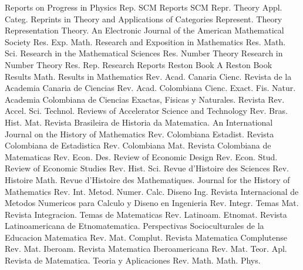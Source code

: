 {Reports on Progress in Physics}
{Rep. SCM}
{Reports SCM}
{Repr. Theory Appl. Categ.}
{Reprints in Theory and Applications of Categories}
{Represent. Theory}
{Representation Theory. An Electronic Journal of the American Mathematical Society}
{Res. Exp. Math.}
{Research and Exposition in Mathematics}
{Res. Math. Sci.}
{Research in the Mathematical Sciences}
{Res. Number Theory}
{Research in Number Theory}
{Res. Rep.}
{Research Reports}
{Reston Book}
{A Reston Book}
{Results Math.}
{Results in Mathematics}
{Rev. Acad. Canaria Cienc.}
{Revista de la Academia Canaria de Ciencias}
{Rev. Acad. Colombiana Cienc. Exact. Fis. Natur.}
{Academia Colombiana de Ciencias Exactas, Fisicas y Naturales. Revista}
{Rev. Accel. Sci. Technol.}
{Reviews of Accelerator Science and Technology}
{Rev. Bras. Hist. Mat.}
{Revista Brasileira de Historia da Matematica. An International Journal on the History of Mathematics}
{Rev. Colombiana Estadist.}
{Revista Colombiana de Estadistica}
{Rev. Colombiana Mat.}
{Revista Colombiana de Matematicas}
{Rev. Econ. Des.}
{Review of Economic Design}
{Rev. Econ. Stud.}
{Review of Economic Studies}
{Rev. Hist. Sci.}
{Revue d'Histoire des Sciences}
{Rev. Histoire Math.}
{Revue d'Histoire des Mathematiques. Journal for the History of Mathematics}
{Rev. Int. Metod. Numer. Calc. Diseno Ing.}
{Revista Internacional de Metodos Numericos para Calculo y Diseno en Ingenieria}
{Rev. Integr. Temas Mat.}
{Revista Integracion. Temas de Matematicas}
{Rev. Latinoam. Etnomat.}
{Revista Latinoamericana de Etnomatematica. Perspectivas Socioculturales de la Educacion Matematica}
{Rev. Mat. Complut.}
{Revista Matematica Complutense}
{Rev. Mat. Iberoam.}
{Revista Matematica Iberoamericana}
{Rev. Mat. Teor. Apl.}
{Revista de Matematica. Teoria y Aplicaciones}
{Rev. Math. Math. Phys.}
